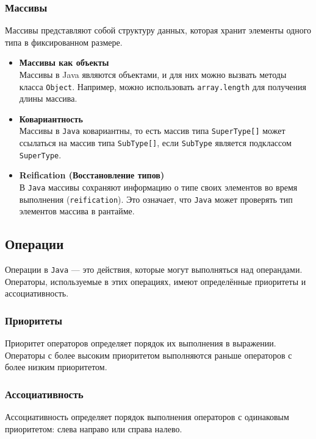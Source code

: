 \subsubsection{Массивы}
Массивы представляют собой структуру данных, которая хранит элементы одного типа в фиксированном размере.

\begin{itemize}
    \item \textbf{Массивы как объекты} \\
    Массивы в Java являются объектами, и для них можно вызвать методы класса \texttt{Object}. Например, можно использовать \texttt{array.length} для получения длины массива.
    
    \item \textbf{Ковариантность} \\
    Массивы в \texttt{Java} ковариантны, то есть массив типа \texttt{SuperType[]} может ссылаться на массив типа \texttt{SubType[]}, если \texttt{SubType} является подклассом \texttt{SuperType}.
    
    \item \textbf{Reification (Восстановление типов)} \\
    В \texttt{Java} массивы сохраняют информацию о типе своих элементов во время выполнения (\texttt{reification}). Это означает, что \texttt{Java} может проверять тип элементов массива в рантайме.
\end{itemize}


\subsection{Операции}
Операции в \texttt{Java} — это действия, которые могут выполняться над операндами. Операторы, используемые в этих операциях, имеют определённые приоритеты и ассоциативность.

\subsubsection{Приоритеты}
Приоритет операторов определяет порядок их выполнения в выражении. Операторы с более высоким приоритетом выполняются раньше операторов с более низким приоритетом.

\subsubsection{Ассоциативность}
Ассоциативность определяет порядок выполнения операторов с одинаковым приоритетом: слева направо или справа налево.


